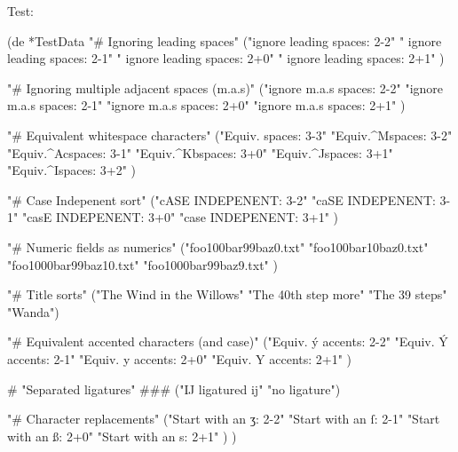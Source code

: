 \begin{wideverbatim}

Test:

(de *TestData
   "# Ignoring leading spaces"
   ("ignore leading spaces: 2-2" " ignore leading spaces: 2-1"
      "  ignore leading spaces: 2+0" "   ignore leading spaces: 2+1" )

   "# Ignoring multiple adjacent spaces (m.a.s)"
   ("ignore m.a.s spaces: 2-2" "ignore m.a.s  spaces: 2-1"
      "ignore m.a.s   spaces: 2+0" "ignore m.a.s    spaces: 2+1" )

   "# Equivalent whitespace characters"
   ("Equiv. spaces: 3-3" "Equiv.^Mspaces: 3-2" "Equiv.^Acspaces: 3-1"
      "Equiv.^Kbspaces: 3+0" "Equiv.^Jspaces: 3+1" "Equiv.^Ispaces: 3+2" )

   "# Case Indepenent sort"
   ("cASE INDEPENENT: 3-2" "caSE INDEPENENT: 3-1" "casE INDEPENENT: 3+0"
      "case INDEPENENT: 3+1" )

   "# Numeric fields as numerics"
   ("foo100bar99baz0.txt" "foo100bar10baz0.txt" "foo1000bar99baz10.txt"
      "foo1000bar99baz9.txt" )

   "# Title sorts"
   ("The Wind in the Willows" "The 40th step more" "The 39 steps" "Wanda")

   "# Equivalent accented characters (and case)"
   ("Equiv. ý accents: 2-2" "Equiv. Ý accents: 2-1" "Equiv. y accents: 2+0"
      "Equiv. Y accents: 2+1" )

   # "Separated ligatures"
   ### ("Ĳ ligatured ij" "no ligature")

   "# Character replacements"
   ("Start with an ʒ: 2-2" "Start with an ſ: 2-1" "Start with an ß: 2+0"
      "Start with an s: 2+1" ) )


\end{wideverbatim}

